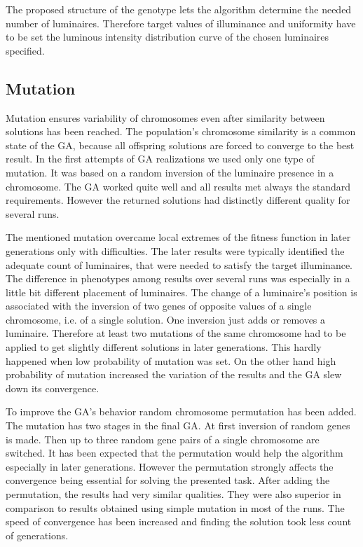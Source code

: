 The proposed structure of the genotype lets the algorithm determine the needed number of luminaires. Therefore target values of illuminance and uniformity have to be set the luminous intensity distribution curve of the chosen luminaires specified.

\subsection{Mutation}
Mutation ensures variability of chromosomes even after similarity between solutions has been reached. The population's chromosome similarity is a common state of the GA, because all offspring solutions are forced to converge to the best result. In the first attempts of GA realizations we used only one type of mutation. It was based on a random inversion of the luminaire presence in a chromosome. The GA worked quite well and all results met always the standard requirements. However the returned solutions had distinctly different quality for several runs.

The mentioned mutation overcame local extremes of the fitness function in later generations only with difficulties. The later results were typically identified the adequate count of luminaires, that were needed to satisfy the target illuminance. The difference in phenotypes among results over several runs was especially in a little bit different placement of luminaires. The change of a luminaire's position is associated with the inversion of two genes of opposite values of a single chromosome, i.e. of a single solution. One inversion just adds or removes a luminaire. Therefore at least two mutations of the same chromosome had to be applied to get slightly different solutions in later generations. This hardly happened when low probability of mutation was set. On the other hand high probability of mutation increased the variation of the results and the GA slew down its convergence.

To improve the GA's behavior random chromosome permutation has been added. The mutation has two stages in the final GA. At first inversion of random genes is made. Then up to three random gene pairs of a single chromosome are switched. It has been expected that the permutation would help the algorithm especially in later generations. However the permutation strongly affects the convergence being essential for solving the presented task. After adding the permutation, the results had very similar qualities. They were also superior in comparison to results obtained using simple mutation in most of the runs. The speed of convergence has been increased and finding the solution took less count of generations.
